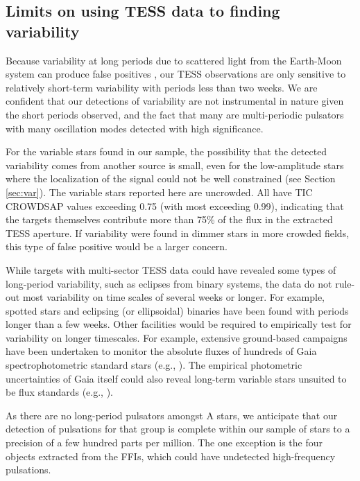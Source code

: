 \documentclass[twocolumn, linenumbers]{aastex631}
\begin{document}
\subsection{Limits on using TESS data to finding variability}
\textbf{}{ 

Because variability at long periods due to scattered light from the Earth-Moon system can produce false positives \citep{Luger2019}, our TESS observations are only sensitive to relatively short-term variability with periods less than two weeks. We are confident that our detections of variability are not instrumental in nature given the short periods observed, and the fact that many are multi-periodic pulsators with many oscillation modes detected with high significance. 

For the variable stars found in our sample, the possibility that the detected variability comes from another source is small, even for the low-amplitude stars where the localization of the signal could not be well constrained (see Section \ref{sec:var}). The variable stars reported here are uncrowded. All have TIC CROWDSAP values exceeding 0.75 (with most exceeding 0.99), indicating that the targets themselves contribute more than 75\% of the flux in the extracted TESS aperture. If variability were found in dimmer stars in more crowded fields, this type of false positive would be a larger concern. 


While targets with multi-sector TESS data could have revealed some types of long-period variability, such as eclipses from binary systems, the data do not rule-out most variability on time scales of several weeks or longer. For example, spotted stars \citep{Mcquillan2014} and eclipsing (or ellipsoidal) binaries \citep{Prsa2021} have been found with periods longer than a few weeks. Other facilities would be required to empirically test for variability on longer timescales. For example, extensive ground-based campaigns have been undertaken to monitor the absolute fluxes of hundreds of Gaia spectrophotometric standard stars (e.g., \citealt{2016MNRAS.462.3616M,2021MNRAS.501.2848A}). The empirical photometric uncertainties of Gaia itself could also reveal long-term variable stars unsuited to be flux standards (e.g., \citealt{2021ApJ...912..125G,2021ApJ...908..180A}).

As there are no long-period pulsators amongst A stars, we anticipate that our detection of pulsations for that group is complete within our sample of stars to a precision of a few hundred parts per million. The one exception is the four objects extracted from the FFIs, which could have undetected high-frequency pulsations.

}
\end{document}
